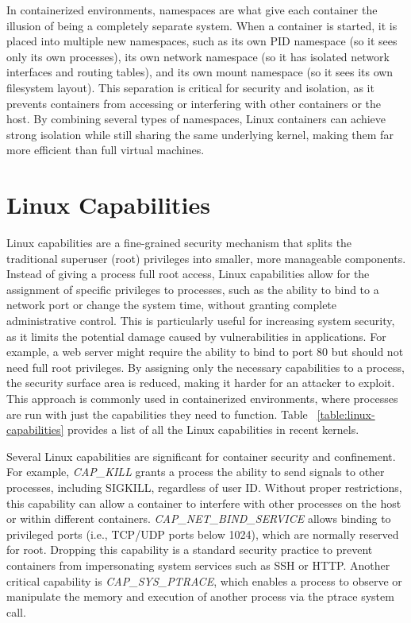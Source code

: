 \begin{doublespace}
In containerized environments, namespaces are what give each container the illusion of being a completely separate system. When a container is started, it is placed into multiple new namespaces, such as its own PID namespace (so it sees only its own processes), its own network namespace (so it has isolated network interfaces and routing tables), and its own mount namespace (so it sees its own filesystem layout). This separation is critical for security and isolation, as it prevents containers from accessing or interfering with other containers or the host. By combining several types of namespaces, Linux containers can achieve strong isolation while still sharing the same underlying kernel, making them far more efficient than full virtual machines.

\section{Linux Capabilities}
Linux capabilities are a fine-grained security mechanism that splits the traditional superuser (root) privileges into smaller, more manageable components. Instead of giving a process full root access, Linux capabilities allow for the assignment of specific privileges to processes, such as the ability to bind to a network port or change the system time, without granting complete administrative control. This is particularly useful for increasing system security, as it limits the potential damage caused by vulnerabilities in applications. For example, a web server might require the ability to bind to port 80 but should not need full root privileges. By assigning only the necessary capabilities to a process, the security surface area is reduced, making it harder for an attacker to exploit. This approach is commonly used in containerized environments, where processes are run with just the capabilities they need to function. Table ~\ref{table:linux-capabilities} provides a list of all the Linux capabilities in recent kernels.

Several Linux capabilities are significant for container security and confinement. For example, \textit{CAP_KILL} grants a process the ability to send signals to other processes, including SIGKILL, regardless of user ID. Without proper restrictions, this capability can allow a container to interfere with other processes on the host or within different containers. \textit{CAP_NET_BIND_SERVICE} allows binding to privileged ports (i.e., TCP/UDP ports below 1024), which are normally reserved for root. Dropping this capability is a standard security practice to prevent containers from impersonating system services such as SSH or HTTP. Another critical capability is \textit{CAP_SYS_PTRACE}, which enables a process to observe or manipulate the memory and execution of another process via the ptrace system call.


\end{doublespace}
